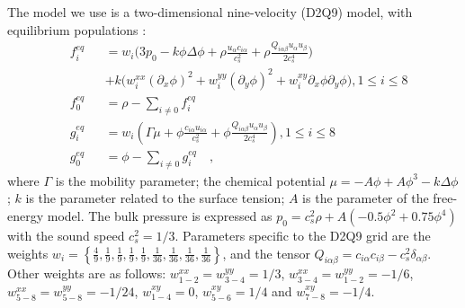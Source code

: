 \documentclass{article}
\begin{document}
The model we use is a two-dimensional nine-velocity (D2Q9) model,
with equilibrium populations \cite{pooley-contact}:
\begin{equation}
\label{set:equilibrium:binary}
\begin{aligned}
&f_i^{eq}&&=w_i 
\biggl(3
p_0 - k \phi \Delta \phi
+\rho\frac{u_{\alpha}c_{i\alpha}}{c_s^2}+\rho \frac{Q_{i\alpha\beta}u_{\alpha } u_ {
\beta}}{2 c_s^4}\biggr)\\
&&&+k\bigl(w_i^{xx} (\partial_x \phi)^2+w_i^{yy} (\partial_y \phi)^2 +w_i^{xy} \partial_x
\phi \partial_y \phi \bigr), 1\leq i \leq 8\\
&f_0^{eq}&&=\rho-\sum_{i\neq0}{f_i^{eq}}\\
&g_i^{eq}&&=w_i\left(\Gamma \mu + \phi\frac{ c_{i\alpha} u_{i\alpha}}{c_s^2}+\phi
\frac{Q_{i\alpha\beta}u_{\alpha}u_{\beta}}{2 c_s^4}\right), 1\leq i \leq 8 \\
&g_0^{eq}&&=\phi-\sum_{i\neq0}{g_i^{eq}}\quad,
\end{aligned}
\end{equation}
where $\Gamma$ is the mobility parameter; the chemical potential
$\mu=-A\phi+A\phi^3-k\Delta\phi$; $k$ is the parameter related to the surface
tension; $A$ is the parameter of the free-energy model. The bulk pressure
is expressed as $p_0=c_s^2 \rho +A (-0.5 \phi^2+0.75 \phi^4)$ with
the sound speed $c_s^2=1/3$. 
Parameters specific to the D2Q9 grid are the weights
$w_i=\left\{\frac{4}{9},\frac{1}{9},\frac{1}{9},\frac{1}{9},\frac{1}{9},
\frac{1}{36},\frac{1}{36},\frac{1}{36},\frac{1}{36}\right\}$, and the tensor
$Q_{i\alpha\beta}=c_{i\alpha} c_{i\beta} - c_s^2 \delta_{\alpha\beta}$.  
Other weights 
are as follows:
$w^{xx}_{1-2}=w^{yy}_{3-4}=1/3$, $w^{xx}_{3-4}=w^{yy}_{1-2}=-1/6$,
$w^{xx}_{5-8}=w^{yy}_{5-8}=-1/24$, $w^{xy}_{1-4}=0$, $w^{xy}_{5-6}=1/4$ and
$w^{xy}_{7-8}=-1/4$. 
\end{document}
